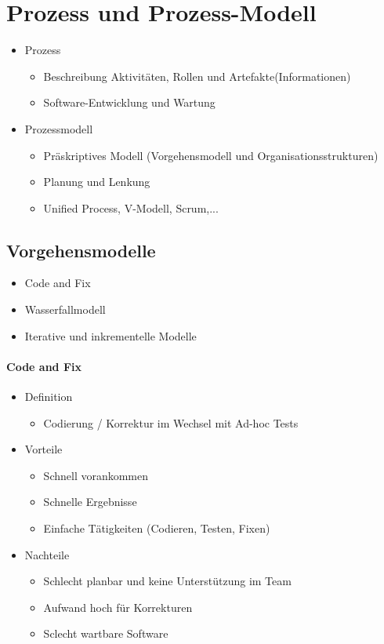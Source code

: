 \documentclass{article}
\begin{document}
\section{Prozess und Prozess-Modell}

\begin{itemize}
    \item Prozess
    \begin{itemize}
        \item Beschreibung Aktivitäten, Rollen und Artefakte(Informationen)
        \item Software-Entwicklung und Wartung
    \end{itemize}
    \item Prozessmodell
    \begin{itemize}
        \item Präskriptives Modell (Vorgehensmodell und Organisationsstrukturen)
        \item Planung und Lenkung
        \item Unified Process, V-Modell, Scrum,...
    \end{itemize}
\end{itemize}
\subsection{Vorgehensmodelle}
\begin{itemize}
    \item Code and Fix
    \item Wasserfallmodell
    \item Iterative und inkrementelle Modelle
\end{itemize}

\paragraph{Code and Fix}
\begin{itemize}
    \item Definition
    \begin{itemize}
        \item Codierung / Korrektur im Wechsel mit Ad-hoc Tests
    \end{itemize}
    \item Vorteile
    \begin{itemize}
        \item Schnell vorankommen
        \item Schnelle Ergebnisse
        \item Einfache Tätigkeiten (Codieren, Testen, Fixen)
    \end{itemize}
    \item Nachteile
    \begin{itemize}
        \item Schlecht planbar und keine Unterstützung im Team
        \item Aufwand hoch für Korrekturen
        \item Sclecht wartbare Software
    \end{itemize}
\end{itemize}
\end{document}
